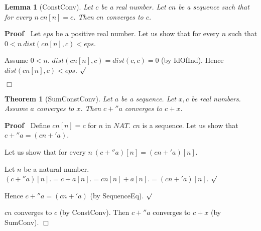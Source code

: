 \documentclass{article}
\newenvironment{forthel}{\begin{leftbar}}{\end{leftbar}}
\newenvironment{proof}{\noindent\textbf{Proof\ }}{\hspace*{\fill}$\Box$\medskip}
\newenvironment{subproof}{\begin{list}{}{}
		\item[\text{Proof}]}{\hfill $\surd$ \end{list}}
\newtheorem{lemma}{Lemma}
\newtheorem{theorem}{Theorem}
\begin{document}
\begin{forthel}
	\begin{lemma}[ConstConv]
	Let $c$ be a real number. Let $cn$ be a sequence such that for every $n \ cn[n] = c$.
	Then $cn$ converges to $c$.
	\end{lemma}
	\begin{proof}
	Let $eps$ be a positive real number.
	Let us show that for every $n$ such that $0 < n \ dist(cn[n],c) < eps$.
	\begin{subproof}
	Assume $0 < n$.
	$dist(cn[n],c) = dist(c,c) = 0$ (by IdOfInd).
	Hence $dist(cn[n],c) < eps$.
	\end{subproof}
	\end{proof}
	
	\begin{theorem}[SumConstConv]
	Let $a$ be a sequence. Let $x,c$ be real numbers. Assume $a$ converges to $x$.
	Then $c +'' a$ converges to $c + x$.
	\end{theorem}
	\begin{proof}
	Define $cn[n] = c$ for $n$ in $NAT$.
	$cn$ is a sequence.
	Let us show that $c +'' a = (cn +' a)$.
	\begin{subproof}
	Let us show that for every $n \ (c +'' a)[n] = (cn +' a)[n]$.
	\begin{subproof}
	Let $n$ be a natural number.
	$(c +'' a)[n] .= c + a[n]
	.= cn[n] + a[n]
	.= (cn +' a)[n]$.
	\end{subproof}
	Hence $c +'' a = (cn +' a)$ (by SequenceEq).
	\end{subproof}
	$cn$ converges to $c$ (by ConstConv).
	Then $c +'' a$ converges to $c + x$ (by SumConv).
	\end{proof}
	

\end{forthel}
\end{document}
